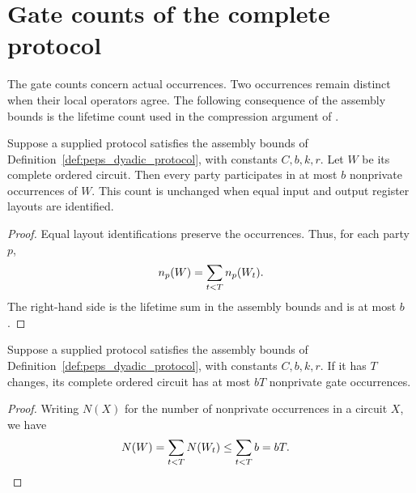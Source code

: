\section{Gate counts of the complete protocol}
\label{sec:peps_dyadic_circuit_bounds}

The gate counts concern actual occurrences. Two occurrences remain distinct
when their local operators agree. The following consequence of the assembly
bounds is the lifetime count used in the compression argument of
\cite[Section~8]{OpenAI2026PolynomialPEPS}.

\begin{theorem}
    \label{thm:peps_dyadic_circuit_lifetime}
    \leanok
    Suppose a supplied protocol satisfies the assembly bounds of
    Definition~\ref{def:peps_dyadic_protocol}, with constants $C,b,k,r$.
    Let $W$ be its complete ordered circuit. Then every party participates in
    at most $b$ nonprivate occurrences of $W$. This count is unchanged when
    equal input and output register layouts are identified.
\end{theorem}
\begin{proof}\leanok
    Equal layout identifications preserve the occurrences. Thus, for each
    party $p$,
    \begin{align}
        n_p(W)=\sum_{t<T}n_p(W_t). \notag
    \end{align}
    The right-hand side is the lifetime sum in the assembly bounds and is
    at most $b$.
\end{proof}

\begin{theorem}
    \label{thm:peps_dyadic_circuit_gate_count}
    \leanok
    Suppose a supplied protocol satisfies the assembly bounds of
    Definition~\ref{def:peps_dyadic_protocol}, with constants $C,b,k,r$.
    If it has $T$ changes, its complete ordered circuit has at most $bT$
    nonprivate gate occurrences.
\end{theorem}
\begin{proof}\leanok
    Writing $N(X)$ for the number of nonprivate occurrences in a circuit $X$,
    we have
    \begin{align}
        N(W) & =\sum_{t<T}N(W_t)\leq\sum_{t<T}b=bT. \notag
    \end{align}
\end{proof}

